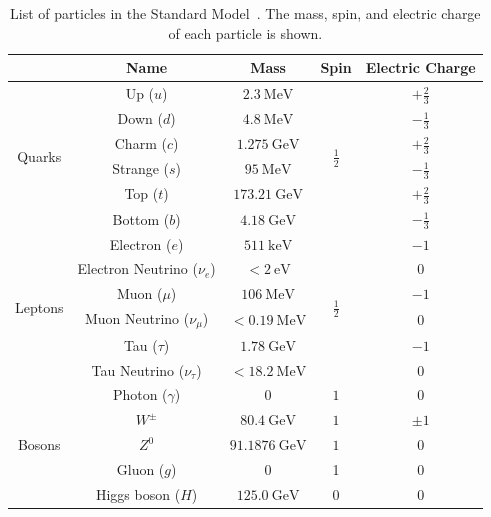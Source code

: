 \begin{table}[htbp]
	\centering
	\begin{tabular}{|c|c|c|c|c|}
		\hline
		 & Name & Mass & Spin & Electric Charge \\
		\hline
		\multirow{6}{*}{\begin{turn}{90}{Quarks}\end{turn}} & Up ($u$) & $\SI{2.3}{\mega\electronvolt}$ & \multirow{6}{*}{$\frac12$} & $+\frac23$ \\
		 & Down ($d$) & $\SI{4.8}{\mega\electronvolt}$ &  & $-\frac13$ \\
		 & Charm ($c$) & $\SI{1.275}{\giga\electronvolt}$ &  & $+\frac23$ \\
		 & Strange ($s$) & $\SI{95}{\mega\electronvolt}$ &  & $-\frac13$ \\
		 & Top ($t$) & $\SI{173.21}{\giga\electronvolt}$ &  & $+\frac23$ \\
		 & Bottom ($b$) & $\SI{4.18}{\giga\electronvolt}$ &  & $-\frac13$ \\
		\hline
		\multirow{6}{*}{\begin{turn}{90}{Leptons}\end{turn}} & Electron ($e$) & $\SI{511}{\kilo\electronvolt}$ & \multirow{6}{*}{$\frac12$} & $-1$ \\
		 & Electron Neutrino ($\nu_{e}$) & $<\SI{2}{\electronvolt}$ &  & $0$ \\
		 & Muon ($\mu$) & $\SI{106}{\mega\electronvolt}$ &  & $-1$ \\
		 & Muon Neutrino ($\nu_{\mu}$) & $<\SI{0.19}{\mega\electronvolt}$ &  & $0$ \\
		 & Tau ($\tau$) & $\SI{1.78}{\giga\electronvolt}$ &  & $-1$ \\
		 & Tau Neutrino ($\nu_{\tau}$) & $<\SI{18.2}{\mega\electronvolt}$ &  & $0$ \\
		\hline
		\multirow{5}{*}{\begin{turn}{90}{Bosons}\end{turn}} & Photon ($\gamma$) & $0$ & $1$ & $0$ \\
		 & $W^{\pm}$ & $\SI{80.4}{\giga\electronvolt}$ & $1$ & $\pm1$ \\
		 & $Z^0$ & $\SI{91.1876}{\giga\electronvolt}$ & $1$ & 0 \\
		 & Gluon ($g$) & 0 & 1 & 0 \\
		 & Higgs boson ($H$) & $\SI{125.0}{\giga\electronvolt}$ & $0$ & $0$ \\
		\hline
	\end{tabular}
	\caption{List of particles in the Standard Model~\cite{pdg}. The mass, spin, and electric charge of each particle is shown.}
	\label{table:standard-model-particles}
\end{table}



